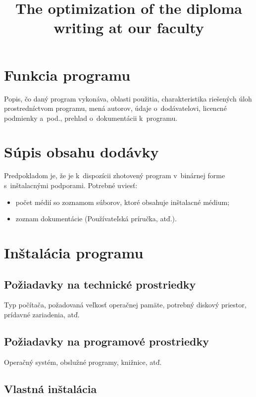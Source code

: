 \documentclass[a4paper]{feidippp}
\title{The optimization of the diploma writing at our faculty}
\begin{document}




\titulnastrana

\newpage


\tableofcontents



\newpage

\setcounter{page}{1}

\section{Funkcia programu}

Popis, čo daný program vykonáva, oblasti použitia, charakteristika riešených úloh prostredníctvom programu, mená autorov, údaje o~dodávatelovi, licencné podmienky a~pod., prehlad o~dokumentácii k~programu. 


\section{Súpis obsahu dodávky}

Predpokladom je, že je k~dispozícii zhotovený program v~binárnej forme s~inštalacnými podporami. Potrebné  uviesť:
\begin{itemize}
\item počet médií so zoznamom súborov, ktoré obsahuje inštalacné médium;
\item zoznam dokumentácie (Používateľská príručka, atď.).
\end{itemize}

\section{Inštalácia programu}

\subsection{Požiadavky na technické prostriedky}

Typ počítača, požadovaná veľkosť operačnej pamäte, potrebný diskový priestor, prídavné zariadenia, atď.

\subsection{Požiadavky na programové prostriedky}
Operačný systém, obslužné programy, knižnice, atď.

\subsection{Vlastná inštalácia}
\end{document}

